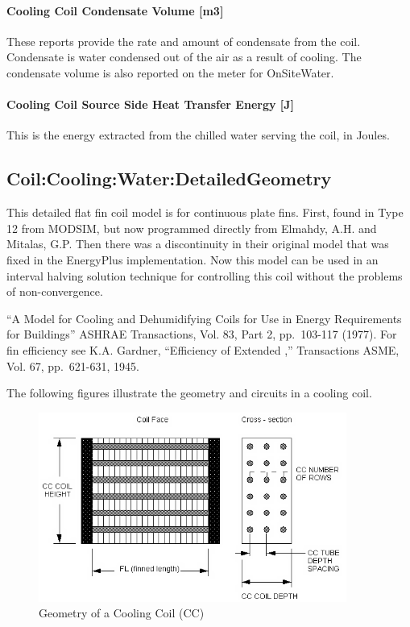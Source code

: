 \paragraph{Cooling Coil Condensate Volume {[}m3{]}}\label{cooling-coil-condensate-volume-m3}

These reports provide the rate and amount of condensate from the coil. Condensate is water condensed out of the air as a result of cooling. The condensate volume is also reported on the meter for OnSiteWater.

\paragraph{Cooling Coil Source Side Heat Transfer Energy {[}J{]}}\label{cooling-coil-source-side-heat-transfer-energy-j}

This is the energy extracted from the chilled water serving the coil, in Joules.


\subsection{Coil:Cooling:Water:DetailedGeometry}\label{coilcoolingwaterdetailedgeometry}

This detailed flat fin coil model is for continuous plate fins. First, found in Type 12 from MODSIM, but now programmed directly from Elmahdy, A.H. and Mitalas, G.P. Then there was a discontinuity in their original model that was fixed in the EnergyPlus implementation. Now this model can be used in an interval halving solution technique for controlling this coil without the problems of non-convergence.

``A Model for Cooling and Dehumidifying Coils for Use in Energy Requirements for Buildings'' ASHRAE Transactions, Vol. 83, Part 2, pp.~103-117 (1977). For fin efficiency see K.A. Gardner, ``Efficiency of Extended ,'' Transactions ASME, Vol. 67, pp.~621-631, 1945.

The following figures illustrate the geometry and circuits in a cooling coil.

\begin{figure}[hbtp] %
\centering
\includegraphics[width=0.9\textwidth, height=0.9\textheight, keepaspectratio=true]{media/image353.png}
\caption{Geometry of a Cooling Coil (CC) \protect \label{fig:geometry-of-a-cooling-coil-cc}}
\end{figure}

